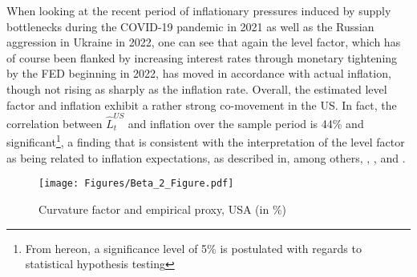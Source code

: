 When looking at the recent period of inflationary pressures induced by supply bottlenecks during the COVID-19 pandemic in 2021 as well as the Russian aggression in Ukraine in 2022, one can see that again the level factor, which has of course been flanked by increasing interest rates through monetary tightening by the FED beginning in 2022, has moved in accordance with actual inflation, though not rising as sharply as the inflation rate. 
Overall, the estimated level factor and inflation exhibit a rather strong co-movement in the US.
In fact, the correlation between $\hat{L}^{US}_{t}$ and inflation over the sample period is 44\% and significant\footnote{From hereon, a significance level of 5\% is postulated with regards to statistical hypothesis testing}, a finding that is consistent with the interpretation of the level factor as being related to inflation expectations, as described in, among others, \citet{dewachter2006macro}, \citet{rudebusch2008macro}, and \citet{diebold2006macroeconomy}.



\begin{figure}[!t]
    \centering
    \texttt{[image: Figures/Beta\_2\_Figure.pdf]}
    \caption{Curvature factor and empirical proxy, USA (in \%)}
    \label{fig:curvature_factor_us}
\end{figure}


